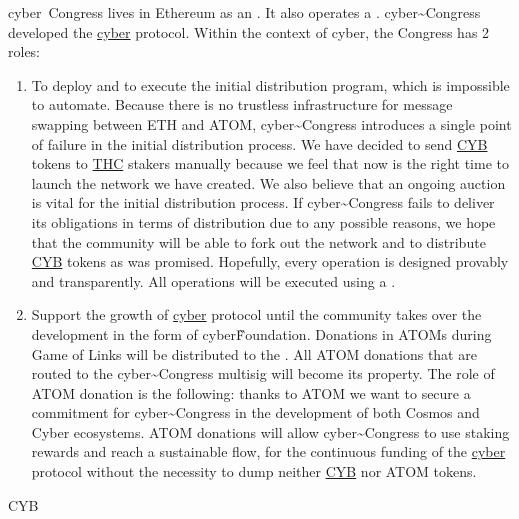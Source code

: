 \documentclass[8pt,oneside]{amsart}
\makeatletter
\newcommand{\linkgreen}[2]{\href{#1}{\color{green}{#2}}}
\renewcommand\subsection{\@startsection{subsection}
                                    {2}{\z@}
                                    {-3.25ex\@plus -1ex \@minus -.2ex}
                                    {0ex \@plus .2ex}
                                    {\play\Large}
                        }
\newcommand{\titleSection}[1]{\subsection{#1}}
\makeatother
\begin{document}
cyber~Congress lives in Ethereum as an \linkgreen{https://mainnet.aragon.org/#/cybercongress/0x4feb2bcc5907e7779130c093eef8fb44502c1330}{Aragon DAO}. It also operates a \linkgreen{https://cyber.page/network/cyber/contract/cyber1latzme6xf6s8tsrymuu6laf2ks2humqvdq39v8}{2-of-3 multisig in Cyber network}. cyber\~{}Congress developed the {\hyperref[cyber]{cyber}} protocol. Within the context of cyber, the Congress has 2 roles:
\begin{enumerate}
 \item To deploy and to execute the initial distribution program, which is impossible to automate. Because there is no trustless infrastructure for message swapping between ETH and ATOM, cyber\~{}Congress introduces a single point of failure in the initial distribution process. We have decided to send {\hyperref[cyb]{CYB}} tokens to {\hyperref[thc]{THC}} stakers manually because we feel that now is the right time to launch the network we have created. We also believe that an ongoing auction is vital for the initial distribution process. If cyber\~{}Congress fails to deliver its obligations in terms of distribution due to any possible reasons, we hope that the community will be able to fork out the network and to distribute {\hyperref[cyb]{CYB}} tokens as was promised. Hopefully, every operation is designed provably and transparently. All operations will be executed using a \linkgreen{https://cyber.page/network/cyber/contract/cyber147drnke9676972jr3anklkj7pzgwjw47cp2u7j}{special purpose 2-of-3 multisig account in Cyber network}.
 \item Support the growth of {\hyperref[cyber]{cyber}} protocol until the community takes over the development in the form of cyber\~Foundation. Donations in ATOMs during Game of Links will be distributed to the \linkgreen{https://www.mintscan.io/account/cosmos1latzme6xf6s8tsrymuu6laf2ks2humqv2tkd9a}{cyber\~{}Congress Cosmos 2-of-3 multisig}. All ATOM donations that are routed to the cyber\~{}Congress multisig will become its property. The role of ATOM donation is the following: thanks to ATOM we want to secure a commitment for cyber\~{}Congress in the development of both Cosmos and Cyber ecosystems. ATOM donations will allow cyber\~{}Congress to use staking rewards and reach a sustainable flow, for the continuous funding of the {\hyperref[cyber]{cyber}} protocol without the necessity to dump neither {\hyperref[cyb]{CYB}} nor ATOM tokens.
\end{enumerate}

\titleSection{CYB}\label{cyb}
\end{document}
